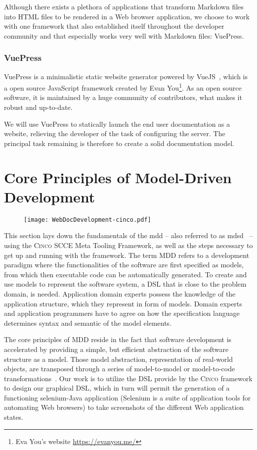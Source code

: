 Although there exists a plethora of applications that transform Markdown files into HTML files to be rendered in a Web browser application, we choose to work with one framework that also established itself throughout the developer community and that especially works very well with Markdown files: VuePress.

\subsubsection{VuePress}\label{sec:VP}

VuePress is a minimalistic static website generator powered by VueJS~\cite{vuepress}, which is a open source JavaScript framework created by Evan You\footnote{Eva You's website \url{https://evanyou.me/}}. As an open source software, it is maintained by a huge community of contributors, what makes it robust and up-to-date.

We will use VuePress to statically launch the end user documentation as a website, relieving the developer of the task of configuring the server. The principal task remaining is therefore to create a solid documentation model.

\section{Core Principles of Model-Driven Development}

\begin{figure}[h]
    \centering
    \texttt{[image: WebDocDevelopment-cinco.pdf]}
    \label{fig:corePrincMDD}
\end{figure}

This section lays down the fundamentals of the \gls{mdd} -- also referred to as \gls{mdsd}~\cite{fowler} --  using the \textsc{Cinco} SCCE Meta Tooling Framework, as well as the steps necessary to get up and running with the framework. The term MDD refers to a development paradigm where the functionalities of the software are first specified as models, from which then executable code can be automatically generated. To create and use models to represent the software system, a DSL that is close to the problem domain, is needed. Application domain experts possess the knowledge of the application structure, which they represent in form of models. Domain experts and application programmers have to agree on how the specification language determines syntax and semantic of the model elements.

The core principles of MDD reside in the fact that software development is accelerated by providing a simple, but efficient abstraction of the software structure as a model. Those model abstraction, representation of real-world objects, are transposed through a series of model-to-model or model-to-code transformations~\cite{stahl_et_al}. Our work is to utilize the DSL provide by the \textsc{Cinco} framework to design our graphical DSL, which in turn will permit the generation of a functioning \gls*{selenium}-Java application (Selenium is a suite of application tools for automating Web browsers) to take screenshots of the different Web application states.

